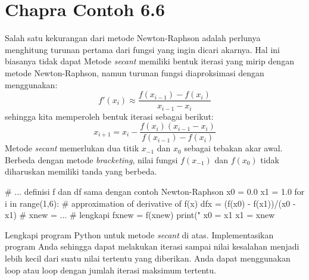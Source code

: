 \section{Chapra Contoh 6.6}
Salah satu kekurangan dari metode Newton-Raphson adalah perlunya menghitung turunan
pertama dari fungsi yang ingin dicari akarnya. Hal ini biasanya tidak dapat 
Metode \textit{secant} memiliki bentuk iterasi yang mirip dengan metode
Newton-Raphson, namun turunan fungsi diaproksimasi dengan menggunakan:
\begin{equation*}
f'(x_{i}) \approx \frac{f(x_{i-1}) - f(x_{i})}{x_{i-1} - x_{i}}
\end{equation*}
sehingga kita memperoleh bentuk iterasi sebagai berikut:
\begin{equation}
x_{i+1} = x_{i} - \frac{f(x_{i}) (x_{i-1} - x_{i})}{f(x_{i-1}) - f(x_{i})}
\end{equation}
Metode \textit{secant} memerlukan dua titik $x_{-1}$ dan $x_{0}$
sebagai tebakan akar awal. Berbeda
dengan metode \textit{bracketing}, nilai fungsi $f(x_{-1})$ dan $f(x_{0})$
tidak diharuskan memiliki tanda yang berbeda.

\begin{pythoncode}
# ... definisi f dan df sama dengan contoh Newton-Raphson
x0 = 0.0
x1 = 1.0
for i in range(1,6):
    # approximation of derivative of f(x)
    dfx = (f(x0) - f(x1))/(x0 - x1)
    #
    xnew = ... # lengkapi
    fxnew = f(xnew)
    print("%
    x0 = x1
    x1 = xnew    
\end{pythoncode}

\begin{soal}
Lengkapi program Python untuk metode \textit{secant} di atas.
Implementasikan program Anda sehingga
dapat melakukan iterasi sampai nilai kesalahan menjadi lebih kecil dari
suatu nilai tertentu yang diberikan. Anda dapat menggunakan loop 
atau loop  dengan jumlah iterasi maksimum tertentu.
\end{soal}